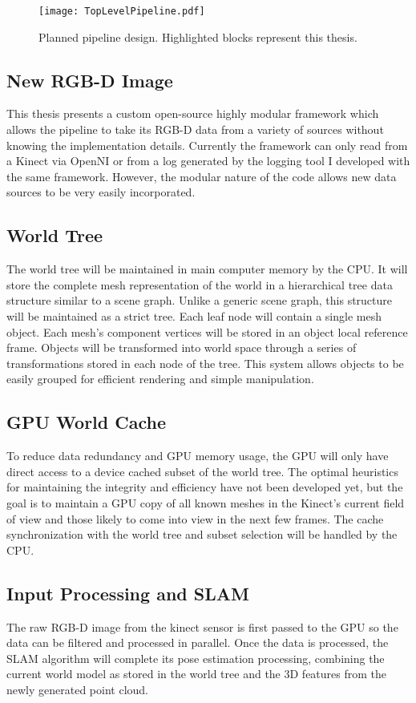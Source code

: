 \begin{figure}[hp]
    \centering
    \texttt{[image: TopLevelPipeline.pdf]}
    \caption{Planned pipeline design. Highlighted blocks represent this thesis.}
    \label{fig:toplevelpipeline}
\end{figure}

\subsection{New RGB-D Image}
This thesis presents a custom open-source highly modular framework which allows the pipeline to take its RGB-D data from a variety of sources without knowing the implementation details. Currently the framework can only read from a Kinect via OpenNI or from a log generated by the logging tool I developed with the same framework. However, the modular nature of the code allows new data sources to be very easily incorporated.

\subsection{World Tree}
The world tree will be maintained in main computer memory by the CPU. It will store the complete mesh representation of the world in a hierarchical tree data structure similar to a scene graph. Unlike a generic scene graph, this structure will be maintained as a strict tree. Each leaf node will contain a single mesh object. Each mesh's component vertices will be stored in an object local reference frame. Objects will be transformed into world space through a series of transformations stored in each node of the tree. This system allows objects to be easily grouped for efficient rendering and simple manipulation.

\subsection{GPU World Cache}
To reduce data redundancy and GPU memory usage, the GPU will only have direct access to a device cached subset of the world tree. The optimal heuristics for maintaining the integrity and efficiency have not been developed yet, but the goal is to maintain a GPU copy of all known meshes in the Kinect's current field of view and those likely to come into view in the next few frames. The cache synchronization with the world tree and subset selection will be handled by the CPU.

\subsection{Input Processing and SLAM}
The raw RGB-D image from the kinect sensor is first passed to the GPU so the data can be filtered and processed in parallel. Once the data is processed, the SLAM algorithm will complete its pose estimation processing, combining the current world model as stored in the world tree and the 3D features from the newly generated point cloud.

